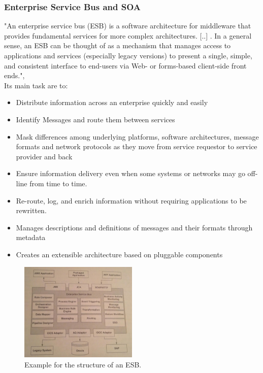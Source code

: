 \documentclass[12pt]{article}
\begin{document}
\subsubsection{Enterprise Service Bus and SOA}
"An enterprise service bus (ESB) is a software architecture for middleware that provides fundamental services for more complex architectures. [..] . In a general sense, an ESB can be thought of as a mechanism that manages access to applications and services (especially legacy versions) to present a single, simple, and consistent interface to end-users via Web- or forms-based client-side front ends.", \cite{esbdef}\\
Its main task are to:
\begin{itemize}
\item Distribute information across an enterprise quickly and easily
\item Identify Messages and route them between services
\item Mask differences among underlying platforms, software architectures, message formats and network protocols as they move from service requestor to service provider and back
\item Ensure information delivery even when some systems or networks may go off-line from time to time.
\item Re-route, log, and enrich information without requiring applications to be rewritten.
\item Manages descriptions and definitions of messages and their formats through metadata
\item Creates an extensible architecture based on pluggable components
\end{itemize} \cite{esbdef,esbimplpatt}

\begin{figure}[here!]
	\centering
	\includegraphics[width=0.5\textwidth]{images/page137sgr}
	  \caption{Example for the structure of an ESB. \cite[page 137]{soagoesreal}}
    \label{fig:context}
	\end{figure}
	\FloatBarrier
\end{document}
